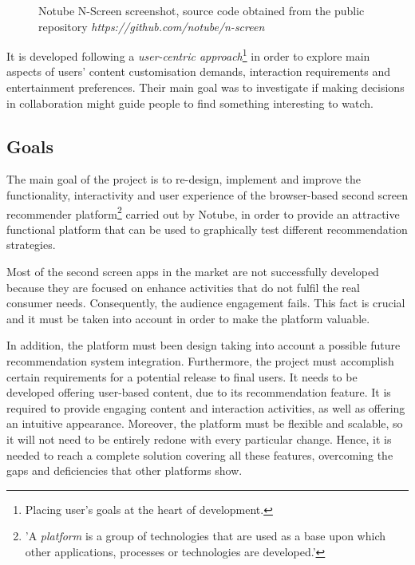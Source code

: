 \documentclass{acm_proc_article-sp}
\begin{document}
\begin{figure}[!htb]
	\centering
	\caption{Notube N-Screen screenshot, source code obtained from the public repository \textit{https://github.com/notube/n-screen}}
	\label{fig:oldnotubenscreen}
\end{figure}

It is developed following a \textit{user-centric approach}\footnote{Placing user's goals at the heart of development.} in order to explore main aspects of users' content customisation demands, interaction requirements and entertainment preferences. Their main goal was to investigate if making decisions in collaboration might guide people to find something interesting to watch. 

\subsection{Goals}

The main goal of the project is to re-design, implement and improve the functionality, interactivity and user experience of the browser-based second screen recommender platform\cite{tech:platform}\footnote{'A \textit{platform} is a group of technologies that are used as a base upon which other applications, processes or technologies are developed.'} carried out by Notube, in order to provide an attractive functional platform that can be used to graphically test different recommendation strategies. 

Most of the second screen apps in the market are not successfully developed because they are focused on enhance activities  that do not fulfil the real consumer needs\cite{evolumedia1}. Consequently, the audience engagement fails. This fact is crucial and it must be taken into account in order to make the platform valuable.

In addition, the platform must been design taking into account a possible future recommendation system integration. Furthermore, the project must accomplish certain requirements for a potential release to final users. It needs to be developed offering user-based content, due to its recommendation feature. It is required to provide engaging content and interaction activities, as well as offering an intuitive appearance. Moreover, the platform must be flexible and scalable, so it will not need to be entirely redone with every particular change. Hence, it is needed to reach a complete solution covering all these features, overcoming the gaps and deficiencies that other platforms show.
\end{document}
